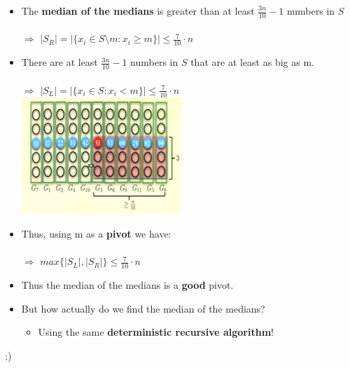 \documentclass[12pt]{article}
\begin{document}
\begin{itemize}
\item The \textbf{median of the medians} is greater than at least {\large $\frac{3n}{10} - 1$ }numbers in $S$\\
\\
$\Rightarrow$     {\large $|S_R| = |\{x_i \in S \setminus m : x_i \geq m\}| \leq \frac{7}{10} \cdot n$}
\item There are at least {\large $\frac{3n}{10}  - 1$ } numbers in $S$ that are at least as big as m.\\
\\
$\Rightarrow$     {\large $|S_L| = |\{x_i \in S : x_i < m\}| \leq \frac{7}{10} \cdot n$}\\
\includegraphics{lecture58}
\item Thus, using m as a \textbf{pivot} we have:\\
\\
$\Rightarrow$    {\large $max\{|S_L|, |S_R|\} \leq \frac{7}{10} \cdot n$}
\item Thus the median of the medians is a \textbf{good} pivot.
\item But how actually do we find the median of the medians?
	\begin{itemize}
	\item Using the same \textbf{deterministic recursive algorithm}!
	\end{itemize}
\end{itemize} 
;)
\\
\\
\\
\\
\\
\\
\\
\\
\\
\\
\\
\\
\\
\\
\end{document}
